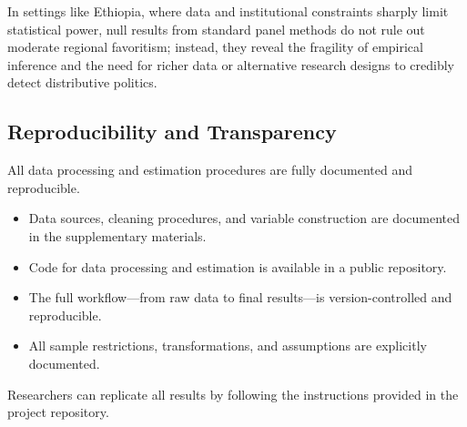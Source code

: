 \documentclass[12pt,a4paper]{article}
\begin{document}
In settings like Ethiopia, where data and institutional constraints sharply limit statistical power, null results from standard panel methods do not rule out moderate regional favoritism; instead, they reveal the fragility of empirical inference and the need for richer data or alternative research designs to credibly detect distributive politics.

\subsection{Reproducibility and Transparency}

All data processing and estimation procedures are fully documented and reproducible.

\begin{itemize}
	\item Data sources, cleaning procedures, and variable construction are documented in the supplementary materials.
	\item Code for data processing and estimation is available in a public repository.
	\item The full workflow—from raw data to final results—is version-controlled and reproducible.
	\item All sample restrictions, transformations, and assumptions are explicitly documented.
\end{itemize}

Researchers can replicate all results by following the instructions provided in the project repository.
\end{document}
